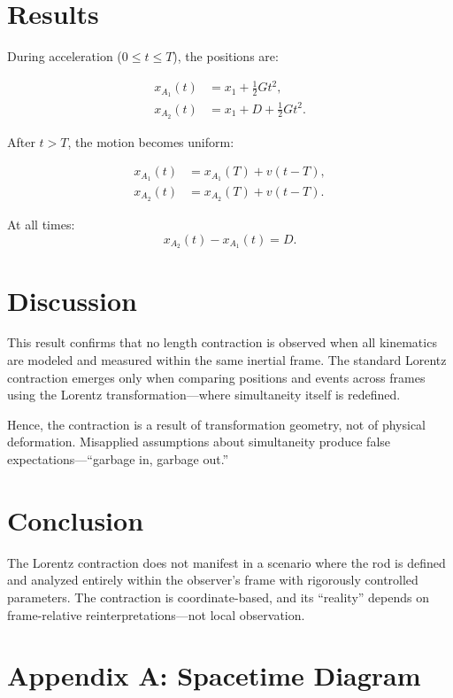 \documentclass[11pt]{article}
\begin{document}
\section{Results}

During acceleration ($0 \le t \le T$), the positions are:

\begin{align*}
    x_{A_1}(t) &= x_1 + \frac{1}{2}Gt^2, \\
    x_{A_2}(t) &= x_1 + D + \frac{1}{2}Gt^2.
\end{align*}

After $t > T$, the motion becomes uniform:

\begin{align*}
    x_{A_1}(t) &= x_{A_1}(T) + v(t - T), \\
    x_{A_2}(t) &= x_{A_2}(T) + v(t - T).
\end{align*}

At all times:
\[
x_{A_2}(t) - x_{A_1}(t) = D.
\]

\section{Discussion}

This result confirms that no length contraction is observed when all kinematics are modeled and measured within the same inertial frame. The standard Lorentz contraction emerges only when comparing positions and events across frames using the Lorentz transformation—where simultaneity itself is redefined.

Hence, the contraction is a result of transformation geometry, not of physical deformation. Misapplied assumptions about simultaneity produce false expectations—“garbage in, garbage out.”

\section{Conclusion}

The Lorentz contraction does not manifest in a scenario where the rod is defined and analyzed entirely within the observer’s frame with rigorously controlled parameters. The contraction is coordinate-based, and its “reality” depends on frame-relative reinterpretations—not local observation.

\newpage
\appendix
\section*{Appendix A: Spacetime Diagram}
\end{document}
